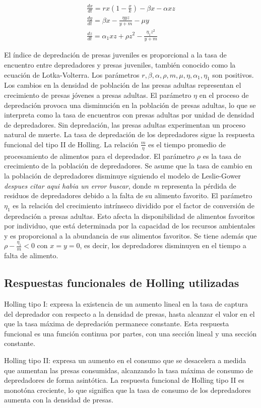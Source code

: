 \documentclass{wscpaperproc}
\theoremstyle{wsc}
\begin{document}
\begin{equation} \label{twoPreyonePredatorEDO}
	\begin{gathered}
		\frac{d x}{d t}=r x\left(1-\frac{x}{k}\right)-\beta x-\alpha x z \\
		\frac{d y}{d t}=\beta x-\frac{\eta y z}{y+m}-\mu y \\
		\frac{d z}{d t}=\alpha_1 x z + \rho z^2-\frac{\eta_1 z^2}{y+m}
	\end{gathered}
\end{equation}
\par
El índice de depredación de presas juveniles es proporcional a la tasa de encuentro entre depredadores y presas juveniles, también conocido como la ecuación de Lotka-Volterra. Los parámetros $r, \beta, \alpha, \rho, m, \mu, \eta , \alpha_1, \eta_1$ son positivos. 
Los cambios en la densidad de población de las presas adultas representan el crecimiento de presas j\'ovenes a presas adultas. 
El parámetro $\eta$ en el proceso de depredación provoca una disminución en la población de presas adultas, lo que se interpreta 
como la tasa de encuentros con presas adultas por unidad de densidad de depredadores. Sin depredación, las presas adultas experimentan un proceso natural 
de muerte. La tasa de depredación de los depredadores sigue la respuesta funcional del tipo II de Holling. La relación $\frac{m}{\eta}$ es el tiempo promedio de 
procesamiento de alimentos para el depredador. El parámetro $\rho$ es la tasa de crecimiento de la población de depredadores. Se asume que la tasa de cambio 
en la población de depredadores disminuye siguiendo el modelo de Leslie-Gower \emph{despues citar aqui habia un error buscar}, donde \emph{m} representa la pérdida de residuos de depredadores debido a la 
falta de su alimento favorito. El parámetro $\eta_1$ es la relación del crecimiento intrínseco dividido por el factor de conversión de depredación a presas adultas. 
Esto afecta la disponibilidad de alimentos favoritos por individuo, que está determinada por la capacidad de los recursos ambientales y es proporcional a la 
abundancia de sus alimentos favoritos. Se tiene además que $\rho - \frac{\eta_1}{m} < 0$ con $x=y=0$, es decir, los depredadores disminuyen en el tiempo a falta de alimento.

\subsection{Respuestas funcionales de Holling utilizadas}
Holling tipo I: expresa la existencia de un aumento lineal en la tasa de captura del depredador con respecto a la densidad de presas, hasta alcanzar el valor en 
el que la tasa máxima de depredación permanece constante. Esta respuesta funcional es una función continua por partes, con una sección lineal y una sección constante.\par
Holling tipo II: expresa un aumento en el consumo que se desacelera a medida que aumentan las presas consumidas, alcanzando la tasa máxima de consumo de 
depredadores de forma asintótica. La respuesta funcional de Holling tipo II es monotóna creciente, lo que significa que la tasa de consumo 
de los depredadores aumenta con la densidad de presas.
\end{document}
